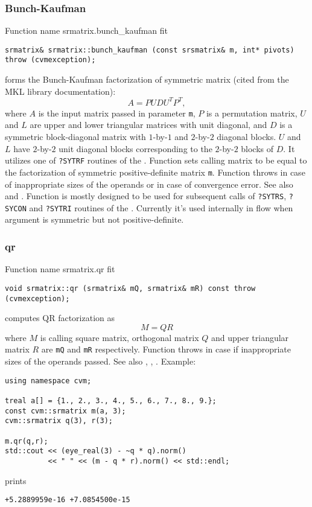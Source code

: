 \subsubsection{Bunch-Kaufman}
Function%
\pdfdest name {srmatrix.bunch_kaufman} fit
\begin{verbatim}
srmatrix& srmatrix::bunch_kaufman (const srsmatrix& m, int* pivots)
throw (cvmexception);
\end{verbatim}
forms the Bunch-Kaufman factorization of  symmetric matrix 
(cited from the MKL library documentation):
\begin{equation*}
A=PUDU^TP^T,
\end{equation*}
where $A$ is the input matrix passed in parameter \verb"m",
$P$ is a permutation matrix, $U$ and $L$ are upper and lower triangular
matrices with unit diagonal, and $D$ is a symmetric 
block-diagonal matrix with $1$-by-$1$ and $2$-by-$2$
diagonal blocks. $U$ and $L$ have $2$-by-$2$ unit diagonal 
blocks corresponding to the $2$-by-$2$ blocks of $D$.
It utilizes one of \verb"?SYTRF" routines of the
.
Function
sets  calling matrix to be equal to the factorization
of  symmetric 
positive-definite matrix \verb"m".
Function throws 
in case of inappropriate sizes of the operands
or in case of convergence error.
See also
 and
.
Function is mostly designed to be used for subsequent calls
of \verb"?SYTRS", \verb"?SYCON" and \verb"?SYTRI" routines of the
.
Currently it's used internally in  flow
when argument is symmetric but not positive-definite.
\newpage


\subsubsection{qr}
Function%
\pdfdest name {srmatrix.qr} fit
\begin{verbatim}
void srmatrix::qr (srmatrix& mQ, srmatrix& mR) const throw (cvmexception);
\end{verbatim}
computes QR factorization as
\begin{equation*}
M=QR
\end{equation*}
where 
$M$ is  calling square matrix, orthogonal matrix $Q$ 
and upper triangular matrix $R$ are \verb"mQ" and \verb"mR"
respectively. 
Function throws
in case if inappropriate sizes of the operands passed.
See also , ,
.
Example:
\begin{Verbatim}
using namespace cvm;

treal a[] = {1., 2., 3., 4., 5., 6., 7., 8., 9.};
const cvm::srmatrix m(a, 3);
cvm::srmatrix q(3), r(3);

m.qr(q,r);
std::cout << (eye_real(3) - ~q * q).norm()
          << " " << (m - q * r).norm() << std::endl;
\end{Verbatim}
prints
\begin{Verbatim}
+5.2889959e-16 +7.0854500e-15
\end{Verbatim}
\newpage



